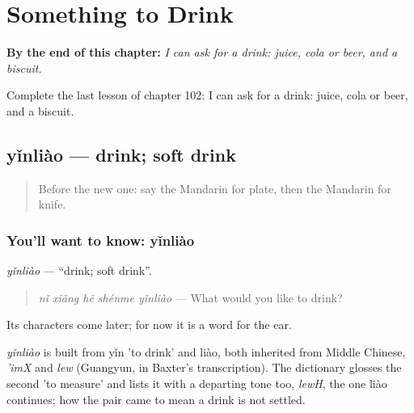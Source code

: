 
\chapter{Something to Drink}
\label{ch:zh-something-to-drink}

\begin{chapteropening}
\textbf{By the end of this chapter:} \emph{I can ask for a drink: juice, cola or beer, and a biscuit.}

Complete the last lesson of chapter 102: I can ask for a drink: juice, cola or beer, and a biscuit.
\end{chapteropening}

\section[yǐnliào]{yǐnliào — drink; soft drink}

\label{lesson:ZH-C102-yinliao}



\begin{quote}
Before the new one: say the Mandarin for plate, then the Mandarin for knife.
\end{quote}

\subsection*{You'll want to know: yǐnliào}
\emph{yǐnliào} — \textquotedblleft{}drink; soft drink\textquotedblright{}.

\begin{quote}
\emph{nǐ xiǎng hē shénme yǐnliào} — What would you like to drink?
\end{quote}

Its characters come later; for now it is a word for the ear.

\begin{cousinweb}
\emph{yǐnliào} is built from yǐn 'to drink' and liào, both inherited from Middle Chinese, \emph{'imX} and \emph{lew} (Guangyun, in Baxter's transcription). The dictionary glosses the second 'to measure' and lists it with a departing tone too, \emph{lewH}, the one liào continues; how the pair came to mean a drink is not settled.
\end{cousinweb}

